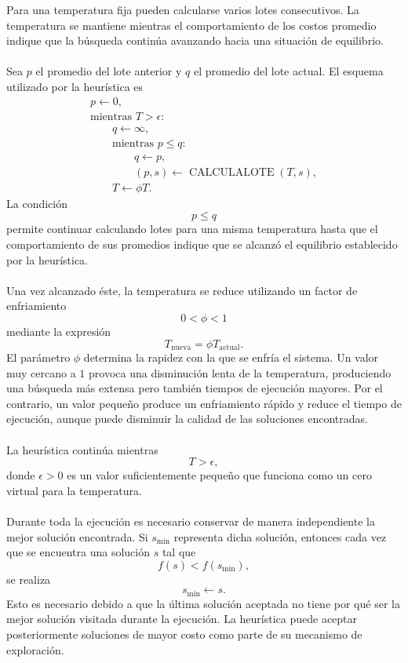 \documentclass[12pt]{article}
\begin{document}
Para una temperatura fija pueden calcularse varios lotes consecutivos. La
temperatura se mantiene mientras el comportamiento de los costos promedio
indique que la búsqueda continúa avanzando hacia una situación de
equilibrio.
\\\\
Sea \(p\) el promedio del lote anterior y \(q\) el promedio del lote
actual. El esquema utilizado por la heurística es
\[
\begin{array}{l}
    p\leftarrow 0,\\
    \text{mientras }T>\epsilon:\\
    \qquad q\leftarrow\infty,\\
    \qquad \text{mientras }p\leq q:\\
    \qquad\qquad q\leftarrow p,\\
    \qquad\qquad (p,s)\leftarrow
        \operatorname{CALCULALOTE}(T,s),\\
    \qquad T\leftarrow\phi T.
\end{array}
\]
La condición
\[
    p\leq q
\]
permite continuar calculando lotes para una misma temperatura hasta que el
comportamiento de sus promedios indique que se alcanzó el equilibrio
establecido por la heurística.
\\\\
Una vez alcanzado éste, la temperatura se reduce utilizando un factor de
enfriamiento
\[
    0<\phi<1
\]
mediante la expresión
\[
    \boxed{
        T_{\text{nueva}}=\phi T_{\text{actual}}
    }.
\]
El parámetro \(\phi\) determina la rapidez con la que se enfría el sistema.
Un valor muy cercano a \(1\) provoca una disminución lenta de la
temperatura, produciendo una búsqueda más extensa pero también tiempos de
ejecución mayores. Por el contrario, un valor pequeño produce un
enfriamiento rápido y reduce el tiempo de ejecución, aunque puede disminuir
la calidad de las soluciones encontradas.
\\\\
La heurística continúa mientras
\[
    T>\epsilon,
\]
donde \(\epsilon>0\) es un valor suficientemente pequeño que funciona como
un cero virtual para la temperatura.
\\\\
Durante toda la ejecución es necesario conservar de manera independiente la
mejor solución encontrada. Si \(s_{\min}\) representa dicha solución,
entonces cada vez que se encuentra una solución \(s\) tal que
\[
    f(s)<f(s_{\min}),
\]
se realiza
\[
    s_{\min}\leftarrow s.
\]
Esto es necesario debido a que la última solución aceptada no tiene por qué
ser la mejor solución visitada durante la ejecución. La heurística puede
aceptar posteriormente soluciones de mayor costo como parte de su mecanismo
de exploración.
\end{document}
